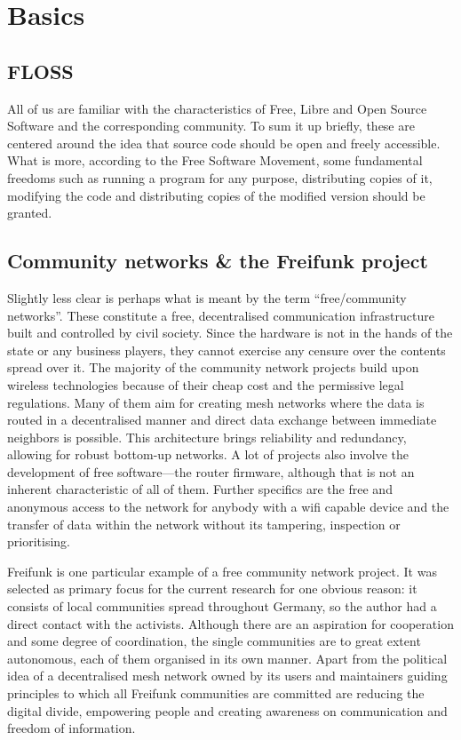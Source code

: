 \section{Basics}
\subsection{FLOSS}
All of us are familiar with the characteristics of Free, Libre and Open Source Software and the corresponding community.
To sum it up briefly, these are centered around the idea that source code should be open and freely accessible.
What is more, according to the Free Software Movement,
some fundamental freedoms such as running a program for any purpose, distributing copies of it, modifying the code and distributing copies of the modified version should be granted\cite{gnuweb}.


\subsection{Community networks \& the Freifunk project}
Slightly less clear is perhaps what is meant by the term ``free/community networks''.
These constitute a free, decentralised communication infrastructure built and controlled by civil society.
Since the hardware is not in the hands of the state or any business players, they cannot exercise any censure over the contents spread over it. %
The majority of the community network projects build upon wireless technologies because of their cheap cost and the permissive legal regulations\cite{WNDW2013}\cite{Medosch2004}.
Many of them aim for creating mesh networks where the data is routed in a decentralised manner and direct data exchange between immediate neighbors is possible.
This architecture brings reliability and redundancy, allowing for robust bottom-up networks\cite{Medosch2004}.
A lot of projects also involve the development of free software---the router firmware, although that is not an inherent characteristic of all of them.
Further specifics are the free and anonymous access to the network for anybody with a wifi capable device and the transfer of data within the network without its tampering, inspection or prioritising\cite{ffweb}\cite{Medosch2004}. %

Freifunk is one particular example of a free community network project.
It was selected as primary focus for the current research for one obvious reason: it consists of local communities spread throughout Germany, so the author had a direct contact with the activists.
Although there are an aspiration for cooperation and some degree of coordination, the single communities are to great extent autonomous, each of them organised in its own manner.
Apart from the political idea of a decentralised mesh network owned by its users and maintainers guiding principles to which all Freifunk communities are committed are reducing the digital divide, empowering people and creating awareness on communication and freedom of information\cite{ffweb}.

